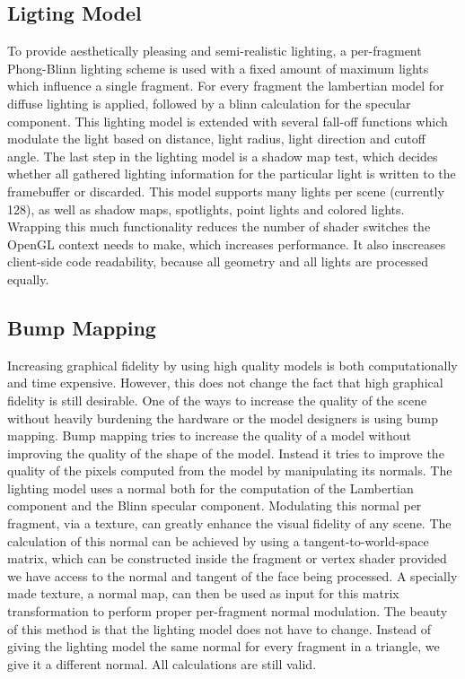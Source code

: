 \subsection{Ligting Model}
To provide aesthetically pleasing and semi-realistic lighting, a per-fragment Phong-Blinn lighting scheme is used with a fixed amount of maximum lights which influence a single fragment. For every fragment the lambertian model for diffuse lighting is applied, followed by a blinn calculation for the specular component. This lighting model is extended with several fall-off functions which modulate the light based on distance, light radius, light direction and cutoff angle. The last step in the lighting model is a shadow map test, which decides whether all gathered lighting information for the particular light is written to the framebuffer or discarded. This model supports many lights per scene (currently 128), as well as shadow maps, spotlights, point lights and colored lights. Wrapping this much functionality reduces the number of shader switches the OpenGL context needs to make, which increases performance. It also inscreases client-side code readability, because all geometry and all lights are processed 
equally.

\subsection{Bump Mapping}
Increasing graphical fidelity by using high quality models is both computationally and time expensive. However, this does not change the fact that high graphical fidelity is still desirable. One of the ways to increase the quality of the scene without heavily burdening the hardware or the model designers is using bump mapping. Bump mapping tries to increase the quality of a model without improving the quality of the shape of the model. Instead it tries to improve the quality of the pixels computed from the model by manipulating its normals.
The lighting model uses a normal both for the computation of the Lambertian component and the Blinn specular component. Modulating this normal per fragment, via a texture, can greatly enhance the visual fidelity of any scene. The calculation of this normal can be achieved by using a tangent-to-world-space matrix, which can be constructed inside the fragment or vertex shader provided we have access to the normal and tangent of the face being processed. A specially made texture, a normal map, can then be used as input for this matrix transformation to perform proper per-fragment normal modulation. The beauty of this method is that the lighting model does not have to change. Instead of giving the lighting model the same normal for every fragment in a triangle, we give it a different normal. All calculations are still valid.

